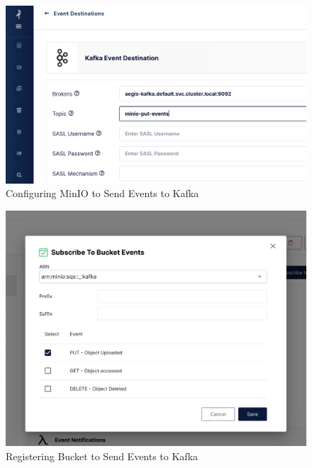 \documentclass[12pt, conference, final, a4paper, onecolumn, compsoc]{IEEEtran}
\begin{document}








\begin{figure}[H]
  \centering \includegraphics[scale=0.31]{images/minio-event-queue.png}
  \caption{Configuring MinIO to Send Events to Kafka}
  \label{appendix:minio-event-queue}
\end{figure}

\begin{figure}[H]
  \centering \includegraphics[scale=0.31]{images/minio-bucket-event.png}
  \caption{Registering Bucket to Send Events to Kafka}
  \label{appendix:minio-bucket-event}
\end{figure}
\end{document}
